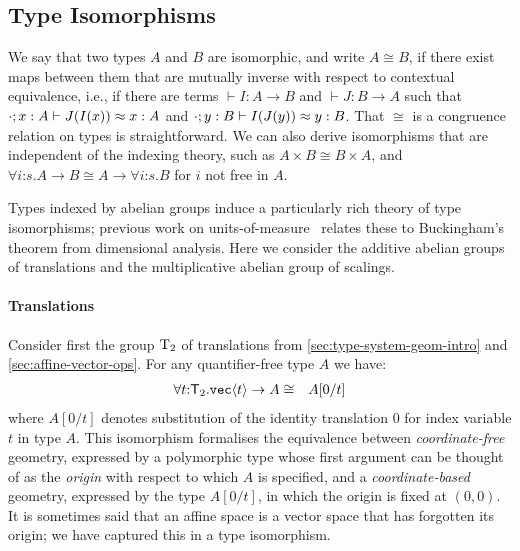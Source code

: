 \subsection{Type Isomorphisms}
\label{sec:types-indexed-abelian-groups}
We say that two types $A$ and $B$ are isomorphic, and write $A \cong
B$, if there exist maps between them that are mutually inverse with
respect to contextual equivalence, i.e., if there are terms $\vdash I
: A \to B$ and $\vdash J : B\to A$ such that ${\cdot};{x:A}\vdash{J(I(x))}\approx{x}:{A}$ 
and ${\cdot};{y:B}\vdash{I(J(y))}\approx{y}:{B}$.
That $\cong$ is a congruence relation on types is straightforward. We
can also derive isomorphisms that are independent of the indexing
theory, such as $A\times B \cong B \times A$, and $\forall
i\mathord:s.A\to B\cong A\to\forall i\mathord:s.B$ for $i$ not free in
$A$.

Types indexed by abelian groups induce a particularly rich theory of
type isomorphisms; previous work on
units-of-measure~\cite{kennedy97relational} relates these to
Buckingham's theorem from dimensional analysis. Here we consider the
additive abelian groups of translations and the multiplicative abelian
group of scalings.

\paragraph{Translations} 
Consider first the group $\mathrm{T}_2$ of translations from
\autoref{sec:type-system-geom-intro} and 
\autoref{sec:affine-vector-ops}. For any quantifier-free type $A$
we have: %
\begin{eqnarray*}
\forall t\mathord:\mathsf{T}_2.\textup{\texttt{vec}}\langle t \rangle\to A
& \cong &
A[0/t]
\end{eqnarray*}
where $A[0/t]$ denotes substitution of the identity translation $0$
for index variable $t$ in type $A$. This isomorphism formalises the
equivalence between \emph{coordinate-free} geometry, expressed by a
polymorphic type whose first argument can be thought of as the
\emph{origin} with respect to which $A$ is specified, and a
\emph{coordinate-based} geometry, expressed by the type $A[0/t]$, in
which the origin is fixed at $(0,0)$. It is sometimes said that an
affine space is a vector space that has forgotten its origin; we have
captured this in a type isomorphism.

